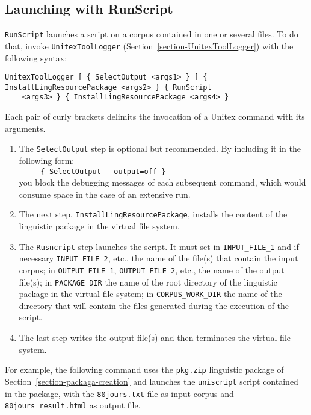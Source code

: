 \subsection{Launching with RunScript}
\label{section-runscript}
\verb$RunScript$ launches a script on a corpus contained in one or several files.
To do that, invoke \verb$UnitexToolLogger$ (Section~\ref{section-UnitexToolLogger})
with the following syntax:

\begin{Verbatim}[fontsize=\small,fontfamily=helvetica]
UnitexToolLogger [ { SelectOutput <args1> } ] { InstallLingResourcePackage <args2> } { RunScript
    <args3> } { InstallLingResourcePackage <args4> }
\end{Verbatim}

\noindent Each pair of curly brackets delimits the invocation of a Unitex command with its arguments.

\begin{enumerate}
\item The \verb$SelectOutput$ step is optional but recommended. By including it in the following form:
\\
\verb$     { SelectOutput --output=off }$\\
you block the debugging messages of each subsequent command, which would consume space in the case of an extensive run.
\item The next step, \verb$InstallLingResourcePackage$, installs the content of the linguistic package
in the virtual file system.
\item The \verb$Rusncript$ step launches the script. It must set in  \verb$INPUT_FILE_1$ and
if necessary \verb$INPUT_FILE_2$, etc., the name of the file(s) that contain the input corpus; in
\verb$OUTPUT_FILE_1$, \verb$OUTPUT_FILE_2$, etc., the name of the output file(s);
in \verb$PACKAGE_DIR$ the name of the root directory of the linguistic package in the virtual
file system; in \verb$CORPUS_WORK_DIR$ the name of the directory that will contain the files
generated during the execution of the script.
\item The last step writes the output file(s) and then terminates the virtual file system.
\end{enumerate}

\noindent For example, the following command uses the \verb$pkg.zip$ linguistic package of
Section~\ref{section-packaga-creation} and launches the 
 \verb$uniscript$ script contained in the package, with the \verb$80jours.txt$ file as input corpus
and \verb$80jours_result.html$ as output file.

